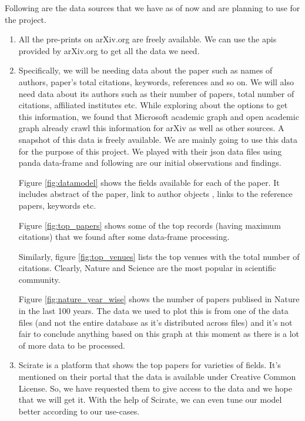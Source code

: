 \documentclass[a4paper, 11pt]{article}
\begin{document}
Following are the data sources that we have as of now and are planning to use for the project. 
\begin{enumerate}
\item All the pre-prints on arXiv.org are freely available. We can use the apis provided by arXiv.org to get all the data we need.  
\item Specifically, we will be needing data about the paper such as names of authors, paper's total citations, keywords, references and so on. We will also need data about its authors such as their number of papers, total number of citations, affiliated institutes etc. While exploring about the options to get this information, we found that Microsoft academic graph and open academic graph \cite{data} already crawl this information for arXiv as well as other sources. A snapshot of this data is freely available. We are mainly going to use this data for the purpose of this project. We played with their json data files using panda data-frame and following are our initial observations and findings.

Figure \ref{fig:datamodel} shows the fields available for each of the paper. It includes abstract of the paper, link to author objects , links to the reference papers, keywords etc. 

Figure \ref{fig:top_papers} shows some of the top records (having maximum citations) that we found after some data-frame processing.

Similarly, figure \ref{fig:top_venues} lists the top venues with the total number of citations. Clearly, Nature and Science are the most popular in scientific community. 

Figure \ref{fig:nature_year_wise} shows the number of papers publised in Nature in the last 100 years. The data we used to plot this is from one of the data files (and not the entire database as it's distributed across files) and it's not fair to conclude anything based on this graph at this moment as there is a lot of more data to be processed.
\item Scirate \cite{scirate} is a platform that shows the top papers for varieties of fields. It's mentioned on their portal that the data is available under Creative Common License. So, we have requested them to give access to the data and we hope that we will get it. With the help of Scirate, we can even tune our model better according to our use-cases.
\end{enumerate}
\end{document}
